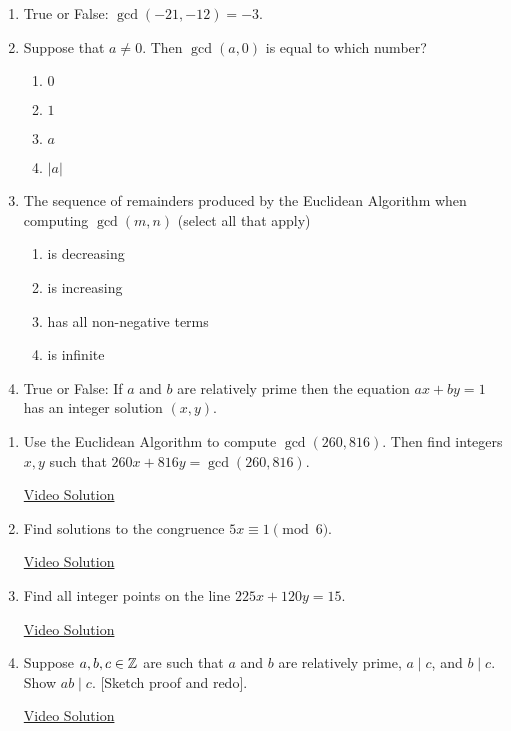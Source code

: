 \pagestyle{empty}


\begin{enumerate}
\item True or False: $\gcd(-21, -12) = -3$.
    
    \item Suppose that $a \neq 0$. Then $\gcd(a,0)$ is equal to which number?
    \begin{enumerate}
        \item $0$
        \item $1$
        \item $a$
        \item $|a|$
    \end{enumerate}
    
    \item The sequence of remainders produced by the Euclidean Algorithm when computing $\gcd(m,n)$ (select all that apply)
    \begin{enumerate}
        \item is decreasing
        \item is increasing
        \item has all non-negative terms
        \item is infinite
    \end{enumerate}
    
    \item True or False: If $a$ and $b$ are relatively prime then the equation $ax+by=1$ has an integer solution $(x,y)$.
\end{enumerate}



\begin{enumerate}
\item Use the Euclidean Algorithm to compute $\gcd(260,816)$. Then find integers $x,y$ such that $260x + 816y = \gcd(260,816)$.
    
    \href{https://youtu.be/L-p2fBqYgi0}{Video Solution}
    
    \item Find solutions to the congruence $5x \equiv 1 \pmod 6$.
    
    \href{https://youtu.be/pCvM5FMgM0c}{Video Solution}
    
    \item Find all integer points on the line $225x + 120y = 15$.
    
    \href{https://youtu.be/WYNwDsiaD7M}{Video Solution}
    
    \item Suppose $a,b,c \in \mathbb{Z}$ are such that $a$ and $b$ are relatively prime, $a \mid c$, and $b \mid c$. Show $ab \mid c$. [Sketch proof and redo].
    
    \href{https://youtu.be/s5OA-h5GJh0}{Video Solution}
\end{enumerate}